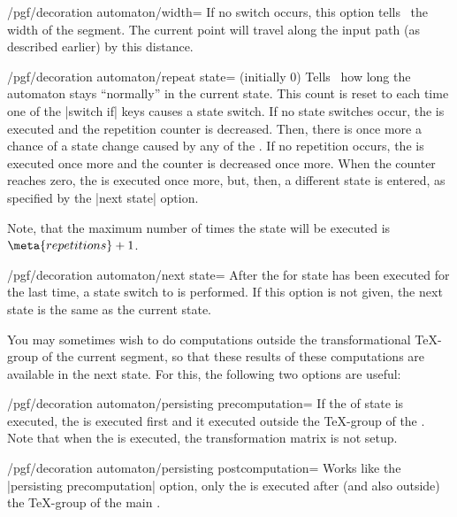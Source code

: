 \begin{command}{\pgfdeclaredecoration{}}
\begin{command}{\state{}}
\begin{key}{/pgf/decoration automaton/width=}
      If no switch occurs, this option tells \pgfname\ the width of
      the segment. The current point will travel along the input path
      (as described earlier)   by this distance.
    \end{key}
    \begin{key}{/pgf/decoration automaton/repeat state= (initially 0)}
      Tells \pgfname\ how long the automaton stays ``normally'' in the
      current state. This count is reset to  each
      time one of the |switch if| keys causes a state switch. If no
      state switches occur, the  is executed and the
      repetition counter is decreased. Then, there is once more a
      chance of a state change caused by any of the . If
      no repetition occurs, the  is executed 
      once more and the counter is decreased once more. When the
      counter reaches zero, the  is executed once more,
      but, then, a different state is entered, as specified by the
      |next state| option.

      Note, that the maximum number of times the state will be executed 
      is $\meta{repetitions}+1$.
    \end{key}
    \begin{key}{/pgf/decoration automaton/next state=}
      After the  for state has been executed for the last
      time, a state switch to  is performed. If this
      option is not given, the next state is the same as the current state.
    \end{key}

    You may sometimes wish to do computations outside the
    transformational \TeX-group of the current segment,
    so that these results of these computations are available in the
    next state. For this, the following two options are useful:
    
    \begin{key}{/pgf/decoration automaton/persisting precomputation=}
      If the  of state is executed, the  is
      executed first and it executed outside the \TeX-group of the
      . Note that when the  is executed, the
      transformation matrix is not setup.
    \end{key}

    \begin{key}{/pgf/decoration automaton/persisting postcomputation=}
      Works like the |persisting precomputation| option, only the
       is executed after (and also outside) the
      \TeX-group of the main .
    \end{key}
    

\end{command}
\end{command}
